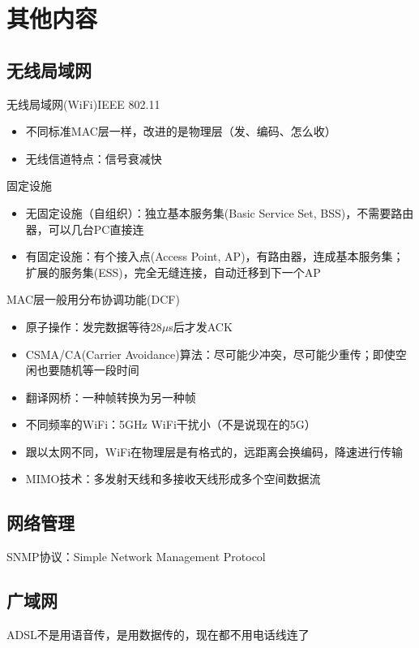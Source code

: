 \section{其他内容}
\subsection{无线局域网}
无线局域网(WiFi)IEEE 802.11
\begin{itemize}
\item 不同标准MAC层一样，改进的是物理层（发、编码、怎么收）
\item 无线信道特点：信号衰减快
\end{itemize}

固定设施
\begin{itemize}
\item 无固定设施（自组织）：独立基本服务集(Basic Service Set, BSS)，不需要路由器，可以几台PC直接连
\item 有固定设施：有个接入点(Access Point, AP)，有路由器，连成基本服务集；
扩展的服务集(ESS)，完全无缝连接，自动迁移到下一个AP
\end{itemize}

MAC层一般用分布协调功能(DCF)
\begin{itemize}
\item 原子操作：发完数据等待28$\mu$s后才发ACK
\item CSMA/CA(Carrier Avoidance)算法：尽可能少冲突，尽可能少重传；即使空闲也要随机等一段时间
\end{itemize}

\begin{itemize}
\item 翻译网桥：一种帧转换为另一种帧
\item 不同频率的WiFi：5GHz WiFi干扰小（不是说现在的5G）
\item 跟以太网不同，WiFi在物理层是有格式的，远距离会换编码，降速进行传输
\item MIMO技术：多发射天线和多接收天线形成多个空间数据流
\end{itemize}

\subsection{网络管理}
SNMP协议：Simple Network Management Protocol

\subsection{广域网}
ADSL不是用语音传，是用数据传的，现在都不用电话线连了

